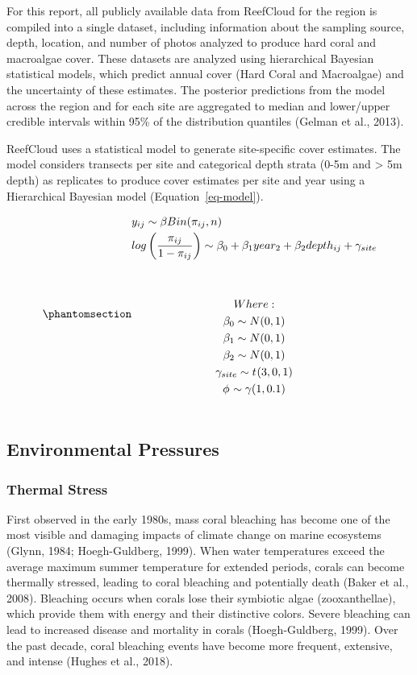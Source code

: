 \documentclass[
  letterpaper,
  DIV=11,
  numbers=noendperiod]{scrartcl}
\begin{document}
For this report, all publicly available data from ReefCloud for the
region is compiled into a single dataset, including information about
the sampling source, depth, location, and number of photos analyzed to
produce hard coral and macroalgae cover. These datasets are analyzed
using hierarchical Bayesian statistical models, which predict annual
cover (Hard Coral and Macroalgae) and the uncertainty of these
estimates. The posterior predictions from the model across the region
and for each site are aggregated to median and lower/upper credible
intervals within 95\% of the distribution quantiles (Gelman et al.,
2013).

ReefCloud uses a statistical model to generate site-specific cover
estimates. The model considers transects per site and categorical depth
strata (0-5m and \textgreater{} 5m depth) as replicates to produce cover
estimates per site and year using a Hierarchical Bayesian model
(Equation~\ref{eq-model}).

\begin{equation}\phantomsection\label{eq-model}{
\begin{multlined}
y_{ij} \sim{} \beta_{}Bin(\pi_{ij},n) \\
log\left(\frac{\pi_{ij}}{1-\pi_{ij}}\right) \sim{} \beta_0  + \beta_1year_2 + \beta_2depth_{ij} + \gamma_{site}
\\
\\
\\Where:
\\
\beta_0 \sim{} N (0,1) 
\\
\beta_1 \sim{} N (0,1) 
\\
\beta_2 \sim{} N (0,1) 
\\
\gamma_{site} \sim{} t_{}(3,0,1) 
\\
\phi_{} \sim{} \gamma_{}(1,0.1)
\\
\end{multlined}
}\end{equation}

\subsection{Environmental Pressures}\label{environmental-pressures}

\subsubsection{Thermal Stress}\label{thermal-stress}

First observed in the early 1980s, mass coral bleaching has become one
of the most visible and damaging impacts of climate change on marine
ecosystems (Glynn, 1984; Hoegh-Guldberg, 1999). When water temperatures
exceed the average maximum summer temperature for extended periods,
corals can become thermally stressed, leading to coral bleaching and
potentially death (Baker et al., 2008). Bleaching occurs when corals
lose their symbiotic algae (zooxanthellae), which provide them with
energy and their distinctive colors. Severe bleaching can lead to
increased disease and mortality in corals (Hoegh-Guldberg, 1999). Over
the past decade, coral bleaching events have become more frequent,
extensive, and intense (Hughes et al., 2018).
\end{document}
